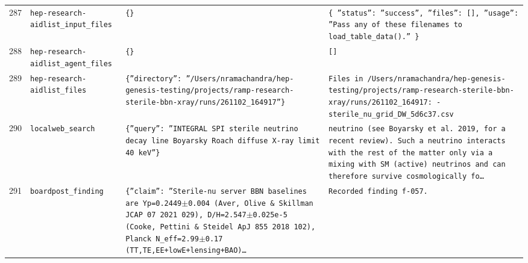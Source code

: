 \documentclass[11pt,a4paper]{article}
\begin{document}
\begin{longtable}{@{}p{}p{}p{}p{}@{}}
287 & \texttt{hep-research-aid}\newline\texttt{list\_\allowbreak{}input\_\allowbreak{}files} & \texttt{\{\}\allowbreak{}} & \texttt{\{   ''status'':\allowbreak{} ''success'',\allowbreak{}   ''files'':\allowbreak{} []\allowbreak{},\allowbreak{}   ''usage'':\allowbreak{} ''Pass any of these filenames to load\_\allowbreak{}table\_\allowbreak{}data()\allowbreak{}.'' \}\allowbreak{}} \\
288 & \texttt{hep-research-aid}\newline\texttt{list\_\allowbreak{}agent\_\allowbreak{}files} & \texttt{\{\}\allowbreak{}} & \texttt{[]\allowbreak{}} \\
289 & \texttt{hep-research-aid}\newline\texttt{list\_\allowbreak{}files} & \texttt{\{''directory'':\allowbreak{} ''/\allowbreak{}Users/\allowbreak{}nramachandra/\allowbreak{}hep-genesis-testing/\allowbreak{}projects/\allowbreak{}ramp-research-sterile-bbn-xray/\allowbreak{}runs/\allowbreak{}261102\_\allowbreak{}164917''\}\allowbreak{}} & \texttt{Files in /\allowbreak{}Users/\allowbreak{}nramachandra/\allowbreak{}hep-genesis-testing/\allowbreak{}projects/\allowbreak{}ramp-research-sterile-bbn-xray/\allowbreak{}runs/\allowbreak{}261102\_\allowbreak{}164917:\allowbreak{}   - sterile\_\allowbreak{}nu\_\allowbreak{}grid\_\allowbreak{}DW\_\allowbreak{}5d6c37.csv} \\
290 & \texttt{local}\newline\texttt{web\_\allowbreak{}search} & \texttt{\{''query'':\allowbreak{} ''INTEGRAL SPI sterile neutrino decay line Boyarsky Roach diffuse X-ray limit 40 keV''\}\allowbreak{}} & \texttt{neutrino (see Boyarsky et al. 2019,\allowbreak{} for a recent review)\allowbreak{}. Such a neutrino interacts with the rest of the matter only via a mixing with SM (active)\allowbreak{} neutrinos and can therefore survive cosmologically fo\ldots{}\allowbreak{}} \\
291 & \texttt{board}\newline\texttt{post\_\allowbreak{}finding} & \texttt{\{''claim'':\allowbreak{} ''Sterile-nu server BBN baselines are Yp=\allowbreak{}0.2449$\pm$0.004 (Aver,\allowbreak{} Olive \& Skillman JCAP 07 2021 029)\allowbreak{},\allowbreak{} D/\allowbreak{}H=\allowbreak{}2.547$\pm$0.025e-5 (Cooke,\allowbreak{} Pettini \& Steidel ApJ 855 2018 102)\allowbreak{},\allowbreak{} Planck N\_\allowbreak{}eff=\allowbreak{}2.99$\pm$0.17 (TT,\allowbreak{}TE,\allowbreak{}EE+lowE+lensing+BAO)\allowbreak{}\ldots{}\allowbreak{}} & \texttt{Recorded finding f-057.} \\

\end{longtable}
\end{document}
